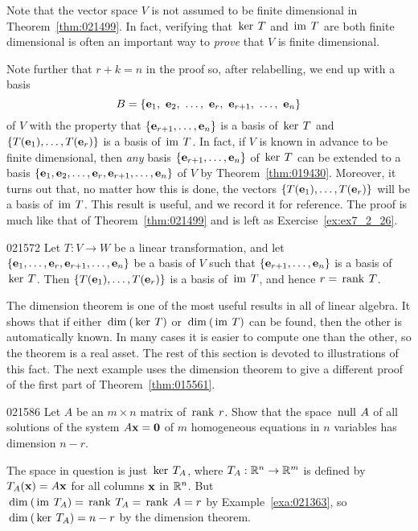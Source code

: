 \noindent Note that the vector space $V$ is not assumed to be finite dimensional in Theorem~\ref{thm:021499}. In fact, verifying that $\thinspace\operatorname{ker \medspace}T$ and $\thinspace\operatorname{im \medspace}T$ are both finite dimensional is often an important way to \textit{prove} that $V$ is finite dimensional.


Note further that $r + k = n$ in the proof so, after relabelling, we end up with a basis
\begin{equation*}
B = \{\vect{e}_1, \ \vect{e}_2, \ \dots, \ \vect{e}_r, \ \vect{e}_{r+1}, \ \dots, \ \vect{e}_n \}
\end{equation*}
of $V$ with the property that $\{\textbf{e}_{r+1}, \dots, \textbf{e}_{n}\}$ is a basis of $\thinspace\operatorname{ker \medspace}T$ and $\{T(\textbf{e}_{1}), \dots, T(\textbf{e}_{r})\}$ is a basis of $\thinspace\operatorname{im \medspace}T$. In fact, if $V$ is known in advance to be finite dimensional, then \textit{any} basis $\{\textbf{e}_{r+1}, \dots, \textbf{e}_{n}\}$ of $\thinspace\operatorname{ker \medspace}T$ can be extended to a basis $\{\textbf{e}_{1}, \textbf{e}_{2}, \dots, \textbf{e}_{r}, \textbf{e}_{r+1}, \dots, \textbf{e}_{n}\}$ of $V$ by Theorem~\ref{thm:019430}. Moreover, it turns out that, no matter how this is done, the vectors $\{T(\textbf{e}_{1}), \dots, T(\textbf{e}_{r})\}$ will be a basis of $\thinspace\operatorname{im \medspace}T$. This result is useful, and we record it for reference. The proof is much like that of Theorem~\ref{thm:021499} and is left as Exercise~\ref{ex:ex7_2_26}.


\begin{theorem}{}{021572}
Let $T : V \to W$ be a linear transformation, and let $\{\textbf{e}_{1}, \dots, \textbf{e}_{r}, \textbf{e}_{r+1}, \dots, \textbf{e}_{n}\}$ be a basis of $V$ such that $\{\textbf{e}_{r+1}, \dots, \textbf{e}_{n}\}$ is a basis of $\thinspace\operatorname{ker \medspace}T$. Then $\{T(\textbf{e}_{1}), \dots, T(\textbf{e}_{r})\}$ is a basis of $\thinspace\operatorname{im \medspace}T$, and hence $r = \thinspace\operatorname{rank \medspace}T$.
\end{theorem}

The dimension theorem is one of the most useful results in all of linear algebra. It shows that if either $\thinspace\operatorname{dim\medspace}(\thinspace\operatorname{ker \medspace}T)$ or $\thinspace\operatorname{dim\medspace}(\thinspace\operatorname{im \medspace}T)$ can be found, then the other is automatically known. In many cases it is easier to compute one than the other, so the theorem is a real asset. The rest of this section is devoted to illustrations of this fact. The next example uses the dimension theorem to give a different proof of the first part of Theorem~\ref{thm:015561}.


\begin{example}{}{021586}
Let $A$ be an $m \times n$ matrix of $\thinspace\operatorname{rank \medspace}r$. Show that the space $\thinspace\operatorname{null \medspace}A$ of all solutions of the system $A\textbf{x} = \textbf{0}$ of $m$ homogeneous equations in $n$ variables has dimension $n - r$.


\begin{solution}
  The space in question is just $\thinspace\operatorname{ker \medspace}T_{A}$, where $T_{A} : \mathbb{R}^n \to \mathbb{R}^m$ is defined by $T_{A}(\textbf{x}) = A\textbf{x}$ for all columns $\textbf{x}$ in $\mathbb{R}^n$. But $\thinspace\operatorname{dim\medspace}(\thinspace\operatorname{im \medspace}T_{A}) = \thinspace\operatorname{rank \medspace}T_{A} = \thinspace\operatorname{rank \medspace}A = r$ by Example~\ref{exa:021363}, so $\thinspace\operatorname{dim\medspace}(\thinspace\operatorname{ker \medspace}T_{A}) = n - r$ by the dimension theorem.
\end{solution}
\end{example}

